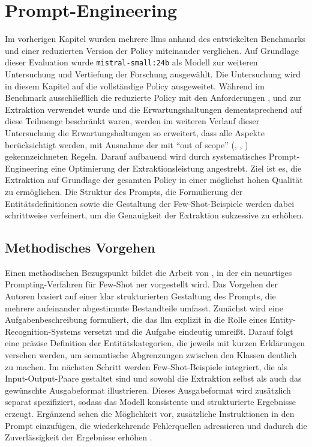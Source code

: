 
\chapter{Prompt-Engineering}\label{ch:prompt-engineering}

Im vorherigen Kapitel wurden mehrere \glspl{llm} anhand des entwickelten Benchmarks und einer reduzierten Version der Policy miteinander verglichen.
Auf Grundlage dieser Evaluation wurde \texttt{mistral-small:24b} als Modell zur weiteren Untersuchung und Vertiefung der Forschung ausgewählt.
Die Untersuchung wird in diesem Kapitel auf die vollständige Policy ausgeweitet.
Während im Benchmark ausschließlich die reduzierte Policy mit den Anforderungen ,  und  zur Extraktion verwendet wurde und die Erwartungshaltungen dementsprechend auf diese Teilmenge beschränkt waren, werden im weiteren Verlauf dieser Untersuchung die Erwartungshaltungen so erweitert, dass alle Aspekte berücksichtigt werden, mit Ausnahme der mit \enquote{out of scope} (, , ) gekennzeichneten Regeln.
Darauf aufbauend wird durch systematisches Prompt-Engineering eine Optimierung der Extraktionsleistung angestrebt.
Ziel ist es, die Extraktion auf Grundlage der gesamten Policy in einer möglichst hohen Qualität zu ermöglichen.
Die Struktur des Prompts, die Formulierung der Entitätsdefinitionen sowie die Gestaltung der Few-Shot-Beispiele werden dabei schrittweise verfeinert, um die Genauigkeit der Extraktion sukzessive zu erhöhen.


\section{Methodisches Vorgehen}\label{sec:methodisches-vorgehen}

Einen methodischen Bezugspunkt bildet die Arbeit von \citeauthor{cheng_novel_2024} \autocite{cheng_novel_2024}, in der ein neuartiges Prompting-Verfahren für Few-Shot \gls{ner} vorgestellt wird.
Das Vorgehen der Autoren basiert auf einer klar strukturierten Gestaltung des Prompts, die mehrere aufeinander abgestimmte Bestandteile umfasst.
Zunächst wird eine Aufgabenbeschreibung formuliert, die das \gls{llm} explizit in die Rolle eines Entity-Recognition-Systems versetzt und die Aufgabe eindeutig umreißt.
Darauf folgt eine präzise Definition der Entitätskategorien, die jeweils mit kurzen Erklärungen versehen werden, um semantische Abgrenzungen zwischen den Klassen deutlich zu machen.
Im nächsten Schritt werden Few-Shot-Beispiele integriert, die als Input-Output-Paare gestaltet sind und sowohl die Extraktion selbst als auch das gewünschte Ausgabeformat illustrieren.
Dieses Ausgabeformat wird zusätzlich separat spezifiziert, sodass das Modell konsistente und strukturierte Ergebnisse erzeugt.
Ergänzend sehen \citeauthor{cheng_novel_2024} \autocite{cheng_novel_2024} die Möglichkeit vor, zusätzliche Instruktionen in den Prompt einzufügen, die wiederkehrende Fehlerquellen adressieren und dadurch die Zuverlässigkeit der Ergebnisse erhöhen \autocite{cheng_novel_2024}.

